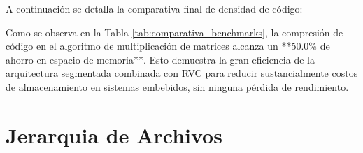 \documentclass[12pt, a4paper]{article}
\begin{document}
A continuación se detalla la comparativa final de densidad de código:

\begin{table}[H]
\centering
{}
\caption{Comparativa de la densidad de código y ahorro de bytes en memoria de instrucciones para programas RV32I vs. RVC.}
\label{tab:comparativa_benchmarks}
\end{table}

Como se observa en la Tabla \ref{tab:comparativa_benchmarks}, la compresión de código en el algoritmo de multiplicación de matrices alcanza un **50.0\% de ahorro en espacio de memoria**. Esto demuestra la gran eficiencia de la arquitectura segmentada combinada con RVC para reducir sustancialmente costos de almacenamiento en sistemas embebidos, sin ninguna pérdida de rendimiento.




\section{Jerarquia de Archivos}
\end{document}
